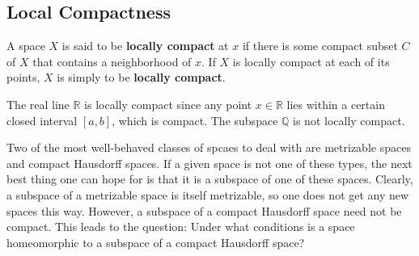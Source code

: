   \subsection{Local Compactness}

    \begin{definition}
    A space $X$ is said to be \textbf{locally compact} at $x$ if there is some compact subset $C$ of $X$ that contains a neighborhood of $x$. If $X$ is locally compact at each of its points, $X$ is simply to be \textbf{locally compact}. 
    \end{definition}

    \begin{example}
    The real line $\mathbb{R}$ is locally compact since any point $x \in \mathbb{R}$ lies within a certain closed interval $[a,b]$, which is compact. The subspace $\mathbb{Q}$ is not locally compact. 
    \end{example}

    Two of the most well-behaved classes of spcaes to deal with are metrizable spaces and compact Hausdorff spaces. If a given space is not one of these types, the next best thing one can hope for is that it is a subspace of one of these spaces. Clearly, a subspace of a metrizable space is itself metrizable, so one does not get any new spaces this way. However, a subspace of a compact Hausdorff space need not be compact. This leads to the question: Under what conditions is a space homeomorphic to a subspace of a compact Hausdorff space? 

